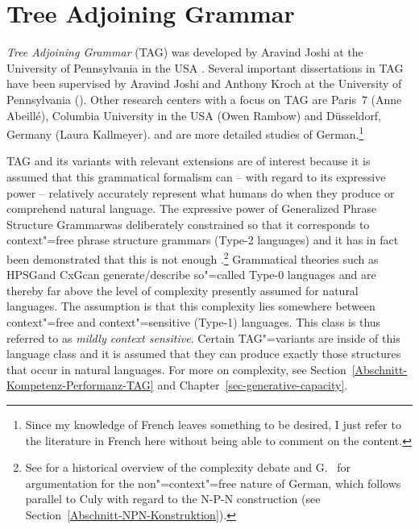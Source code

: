 
\chapter{Tree Adjoining Grammar}
\label{Kapitel-TAG}

\newcommand{\dotted}[0]{\makedash{2pt}}
\newcommand{\g}[1]{{\footnotesize $#1$}}


\emph{Tree Adjoining Grammar} (TAG)
was developed by Aravind Joshi at the University of Pennsylvania in the USA \citep*{JLT75a-u}. 
Several important dissertations in TAG have been supervised by Aravind
Joshi and Anthony Kroch at the University of Pennsylvania (\eg \citealp{Rambow94a}).
Other research centers with a focus on TAG are Paris~7 (Anne Abeill\'{e}), Columbia University in the USA
(Owen Rambow) and Düsseldorf, Germany (Laura Kallmeyer).
 and  are more detailed studies of German.\footnote{
	Since my knowledge of French leaves something to be desired, I just refer to the literature in French here without being
	able to comment on the content.%
}

TAG and its variants with relevant extensions are of interest because it is assumed that this grammatical formalism can -- with regard to its
expressive power -- relatively accurately represent what humans do when they produce or comprehend natural language.
The expressive power of Generalized Phrase Structure Grammar\indexgpsg was deliberately constrained so that it corresponds to context"=free
phrase structure grammars (Type-2 languages) and it has in fact been demonstrated that this is not enough \citep{Shieber85a,Culy85a}.\footnote{%
	See \citet{Pullum86a} for a historical overview of the complexity debate and G.\  for argumentation for the non"=context"=free nature
	of German, which follows parallel to  Culy with regard to the N-P-N construction (see Section~\ref{Abschnitt-NPN-Konstruktion}).%
	} Grammatical theories such as HPSG\indexhpsg and CxG\indexcxg can generate/describe so"=called Type-0 languages and are thereby far above the level
	of complexity presently assumed for natural languages. 
The assumption is that this complexity lies somewhere between context"=free
and context"=sensitive (Type-1) languages. This class is thus referred to as \emph{mildly context sensitive}.
Certain TAG"=variants are inside of this language class and it is assumed that they can produce exactly those structures that occur in
natural languages. For more on complexity, see Section~\ref{Abschnitt-Kompetenz-Performanz-TAG} and Chapter~\ref{sec-generative-capacity}.

